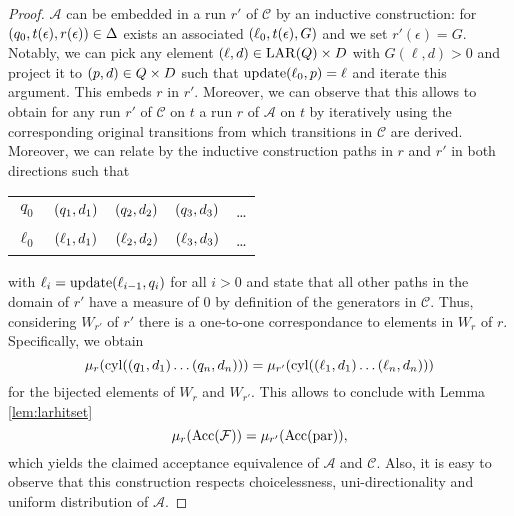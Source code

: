 \begin{proof}
  $\mathcal{A}$ can be embedded in a run $r'$ of $\mathcal{C}$ by an 
  inductive construction: for $\left(q_{0}, t(\epsilon), r(\epsilon)\right)\in
  \Delta$ exists an associated $\left(\ell_{0}, t(\epsilon), G\right)$ and we set
  $r'(\epsilon) = G$. Notably, we can pick any element 
  $\left(\ell, d\right)\in\operatorname{LAR}(Q)\times D$ with $G(\ell, d) > 0$ and project it to
  $\left(p, d\right)\in Q\times D$ such that $\operatorname{update}(\ell_{0}, p) = \ell$ and iterate
  this argument. This embeds $r$ in $r'$. Moreover, we can observe that this 
  allows to obtain for any run $r'$ of $\mathcal{C}$ on $t$ a run $r$ of 
  $\mathcal{A}$ on $t$ by iteratively using the corresponding original 
  transitions from which transitions in $\mathcal{C}$ are derived. Moreover, 
  we can relate by the inductive construction paths in $r$ and $r'$ in both 
  directions such that
  \begin{center}
    \begin{tabular}{ccccc}
      $q_{0}$ & $\left(q_{1}, d_{1}\right)$ & $\left(q_{2}, d_{2}\right)$ & 
        $\left(q_{3}, d_{3}\right)$ & \dots\\
      $\ell_{0}$ & $\left(\ell_{1}, d_{1}\right)$ & $\left(\ell_{2}, d_{2}\right)$ & 
        $\left(\ell_{3}, d_{3}\right)$ & \dots
    \end{tabular}
  \end{center}
  with $\ell_{i} = \operatorname{update}(\ell_{i-1}, q_{i})$ for all $i>0$ and state that all 
  other paths in the domain of $r'$ have a measure of $0$ by definition of the
  generators in $\mathcal{C}$. Thus, considering $W_{r'}$ of $r'$ there is a 
  one-to-one correspondance to elements in $W_{r}$ of $r$. Specifically, we 
  obtain
  \begin{equation*}
    \mu_{r}(\operatorname{cyl}(\left(q_{1},d_{1}\right)\dots\left(q_{n},d_{n}\right))) = 
      \mu_{r'}(\operatorname{cyl}(\left(\ell_{1},d_{1}\right)\dots\left(\ell_{n},d_{n}\right)))
  \end{equation*}
  for the bijected elements of $W_{r}$ and $W_{r'}$. This allows to conclude 
  with Lemma \ref{lem:larhitset}
  \begin{equation*}
    \mu_{r}(\operatorname{Acc}(\mathcal{F})) = \mu_{r'}(\operatorname{Acc}(\operatorname{par})),
  \end{equation*} 
  which yields the claimed acceptance equivalence of $\mathcal{A}$ and 
  $\mathcal{C}$. Also, it is easy to observe that this construction respects
  choicelessness, uni-directionality and uniform distribution of $\mathcal{A}$.
\end{proof}

